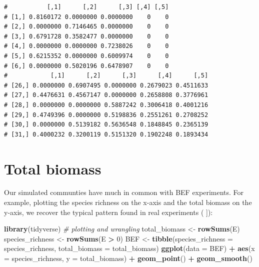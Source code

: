\documentclass[]{book}
\newenvironment{Shaded}{\begin{snugshade}}{\end{snugshade}}
\newcommand{\CommentTok}[1]{\textcolor[rgb]{0.56,0.35,0.01}{\textit{#1}}}
\newcommand{\DataTypeTok}[1]{\textcolor[rgb]{0.13,0.29,0.53}{#1}}
\newcommand{\DecValTok}[1]{\textcolor[rgb]{0.00,0.00,0.81}{#1}}
\newcommand{\KeywordTok}[1]{\textcolor[rgb]{0.13,0.29,0.53}{\textbf{#1}}}
\newcommand{\NormalTok}[1]{#1}
\newcommand{\OperatorTok}[1]{\textcolor[rgb]{0.81,0.36,0.00}{\textbf{#1}}}
\newcommand{\StringTok}[1]{\textcolor[rgb]{0.31,0.60,0.02}{#1}}
\begin{document}
\begin{verbatim}
#           [,1]      [,2]      [,3] [,4] [,5]
# [1,] 0.8160172 0.0000000 0.0000000    0    0
# [2,] 0.0000000 0.7146465 0.0000000    0    0
# [3,] 0.6791728 0.3582477 0.0000000    0    0
# [4,] 0.0000000 0.0000000 0.7238026    0    0
# [5,] 0.6215352 0.0000000 0.6009974    0    0
# [6,] 0.0000000 0.5020196 0.6478907    0    0
#            [,1]      [,2]      [,3]      [,4]      [,5]
# [26,] 0.0000000 0.6907495 0.0000000 0.2679023 0.4511633
# [27,] 0.4476631 0.4567147 0.0000000 0.2658808 0.3776961
# [28,] 0.0000000 0.0000000 0.5887242 0.3006418 0.4001216
# [29,] 0.4749396 0.0000000 0.5198836 0.2551261 0.2708252
# [30,] 0.0000000 0.5139182 0.5636548 0.1848845 0.2365139
# [31,] 0.4000232 0.3200119 0.5151320 0.1902248 0.1893434
\end{verbatim}

\hypertarget{total-biomass}{%
\section{Total biomass}\label{total-biomass}}

Our simulated communties have much in common with BEF experiments. For example, plotting the species richness on the x-axis and the total biomass on the y-axis, we recover the typical pattern found in real experiments (\citep{hector1999plant} \citep{tilman2001diversity} \citet{cadotte2013experimental}{]}):

\begin{Shaded}
\begin{Highlighting}[]
\KeywordTok{library}\NormalTok{(tidyverse) }\CommentTok{# plotting and wrangling}
\NormalTok{total_biomass <-}\StringTok{ }\KeywordTok{rowSums}\NormalTok{(E)}
\NormalTok{species_richness <-}\StringTok{ }\KeywordTok{rowSums}\NormalTok{(E }\OperatorTok{>}\StringTok{ }\DecValTok{0}\NormalTok{)}
\NormalTok{BEF <-}\StringTok{ }\KeywordTok{tibble}\NormalTok{(}\DataTypeTok{species_richness =}\NormalTok{ species_richness, }\DataTypeTok{total_biomass =}\NormalTok{ total_biomass)}
\KeywordTok{ggplot}\NormalTok{(}\DataTypeTok{data =}\NormalTok{ BEF) }\OperatorTok{+}\StringTok{ }
\StringTok{  }\KeywordTok{aes}\NormalTok{(}\DataTypeTok{x =}\NormalTok{ species_richness, }\DataTypeTok{y =}\NormalTok{ total_biomass) }\OperatorTok{+}\StringTok{ }
\StringTok{  }\KeywordTok{geom_point}\NormalTok{() }\OperatorTok{+}\StringTok{ }\KeywordTok{geom_smooth}\NormalTok{()}
\end{Highlighting}
\end{Shaded}
\end{document}
